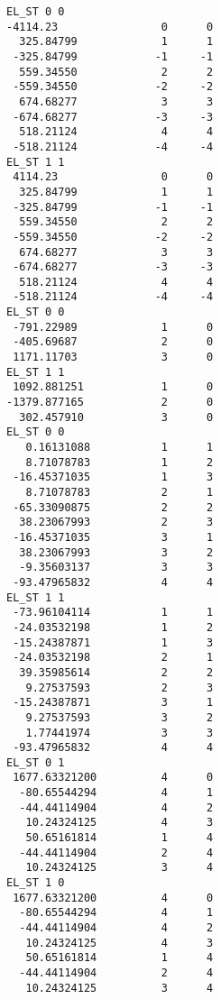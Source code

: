 \documentclass[bibliography=totoc,12pt,a4paper]{scrartcl}
\begin{document}
\begin{lstlisting}[language=qcmaquis,caption={Vibronic integral file format.},
				   label=lst:vibronicDump]
EL_ST 0 0
-4114.23                0      0
  325.84799             1      1     
 -325.84799            -1     -1
  559.34550             2      2     
 -559.34550            -2     -2
  674.68277             3      3     
 -674.68277            -3     -3     
  518.21124             4      4     
 -518.21124            -4     -4     
EL_ST 1 1
 4114.23                0      0
  325.84799             1      1     
 -325.84799            -1     -1
  559.34550             2      2     
 -559.34550            -2     -2
  674.68277             3      3     
 -674.68277            -3     -3     
  518.21124             4      4     
 -518.21124            -4     -4     
EL_ST 0 0
 -791.22989             1      0
 -405.69687             2      0
 1171.11703             3      0
EL_ST 1 1
 1092.881251            1      0
-1379.877165            2      0
  302.457910            3      0
EL_ST 0 0
   0.16131088           1      1
   8.71078783           1      2
 -16.45371035           1      3
   8.71078783           2      1
 -65.33090875           2      2
  38.23067993           2      3
 -16.45371035           3      1
  38.23067993           3      2
  -9.35603137           3      3
 -93.47965832           4      4
EL_ST 1 1 
 -73.96104114           1      1
 -24.03532198           1      2
 -15.24387871           1      3
 -24.03532198           2      1
  39.35985614           2      2
   9.27537593           2      3
 -15.24387871           3      1
   9.27537593           3      2
   1.77441974           3      3
 -93.47965832           4      4
EL_ST 0 1
 1677.63321200          4      0
  -80.65544294          4      1
  -44.44114904          4      2
   10.24324125          4      3
   50.65161814          1      4
  -44.44114904          2      4
   10.24324125          3      4
EL_ST 1 0
 1677.63321200          4      0
  -80.65544294          4      1
  -44.44114904          4      2
   10.24324125          4      3
   50.65161814          1      4
  -44.44114904          2      4
   10.24324125          3      4
\end{lstlisting}
\end{document}
